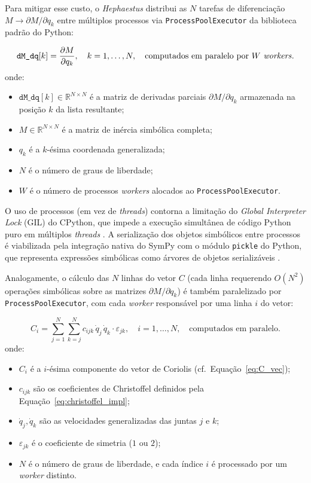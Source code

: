 Para mitigar esse custo, o \textit{Hephaestus} distribui as $N$ tarefas de diferenciação $M \to \partial M/\partial q_k$ entre múltiplos processos via \texttt{ProcessPoolExecutor} da biblioteca padrão do Python:

\begin{equation}
    \texttt{dM\_dq}[k] = \frac{\partial M}{\partial q_k}, \quad k = 1, \ldots, N, \quad \text{computados em paralelo por } W \text{ \textit{workers}}.
    \label{eq:dMdq_parallel}
\end{equation}
onde:
\begin{itemize}
    \item $\texttt{dM\_dq}[k] \in \mathbb{R}^{N\times N}$ é a matriz de derivadas parciais $\partial M/\partial q_k$ armazenada na posição $k$ da lista resultante;
    \item $M \in \mathbb{R}^{N\times N}$ é a matriz de inércia simbólica completa;
    \item $q_k$ é a $k$-ésima coordenada generalizada;
    \item $N$ é o número de graus de liberdade;
    \item $W$ é o número de processos \textit{workers} alocados ao \texttt{ProcessPoolExecutor}.
\end{itemize}

O uso de processos (em vez de \textit{threads}) contorna a limitação do \textit{Global Interpreter Lock} (GIL) do CPython, que impede a execução simultânea de código Python puro em múltiplos \textit{threads} \cite{beazley2010understanding}. A serialização dos objetos simbólicos entre processos é viabilizada pela integração nativa do SymPy com o módulo \texttt{pickle} do Python, que representa expressões simbólicas como árvores de objetos serializáveis \cite{meurer2017sympy}.

Analogamente, o cálculo das $N$ linhas do vetor $C$ (cada linha requerendo $O(N^2)$ operações simbólicas sobre as matrizes $\partial M/\partial q_k$) é também paralelizado por \texttt{ProcessPoolExecutor}, com cada \textit{worker} responsável por uma linha $i$ do vetor:

\begin{equation}
    C_i = \sum_{j=1}^{N}\sum_{k=j}^{N} c_{ijk}\,\dot{q}_j\,\dot{q}_k \cdot \varepsilon_{jk}, \quad i = 1, \ldots, N, \quad \text{computados em paralelo}.
    \label{eq:C_parallel}
\end{equation}
onde:
\begin{itemize}
    \item $C_i$ é a $i$-ésima componente do vetor de Coriolis (cf.\ Equação~\eqref{eq:C_vec});
    \item $c_{ijk}$ são os coeficientes de Christoffel definidos pela Equação~\eqref{eq:christoffel_impl};
    \item $\dot{q}_j, \dot{q}_k$ são as velocidades generalizadas das juntas $j$ e $k$;
    \item $\varepsilon_{jk}$ é o coeficiente de simetria ($1$ ou $2$);
    \item $N$ é o número de graus de liberdade, e cada índice $i$ é processado por um \textit{worker} distinto.
\end{itemize}


